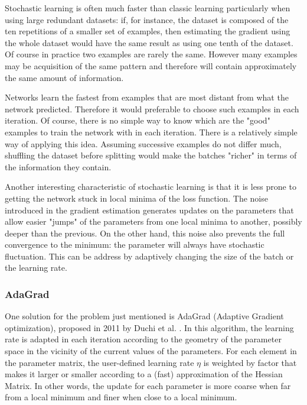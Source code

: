 Stochastic learning is often much faster than classic learning particularly when using large redundant datasets: if, for instance, the dataset is composed of the ten repetitions of a smaller set of examples, then estimating the gradient using the whole dataset would have the same result as using one tenth of the dataset. Of course in practice two examples are rarely the same. However many examples may be acquisition of the same pattern and therefore will contain approximately the same amount of information.

Networks learn the fastest from examples that are most distant from what the network predicted. Therefore it would preferable to choose such examples in each iteration. Of course, there is no simple way to know which are the "good" examples to train the network with in each iteration. There is a relatively simple way of applying this idea. Assuming successive examples do not differ much, shuffling the dataset before splitting would make the batches "richer" in terms of the information they contain.

Another interesting characteristic of stochastic learning is that it is less prone to getting the network stuck in local minima of the loss function. The noise introduced in the gradient estimation generates updates on the parameters that allow easier "jumps" of the parameters from one local minima to another, possibly deeper than the previous. On the other hand, this noise also prevents the full convergence to the minimum: the parameter will always have stochastic fluctuation. This can be address by  adaptively changing the size of the batch or the learning rate. \cite{lecun2012efficient}

\subsubsection{AdaGrad}
\label{subsubsec:Adagrad}
One solution for the problem just mentioned is AdaGrad (Adaptive Gradient optimization), proposed in 2011 by Duchi et al. \cite{duchi2011adaptive}. In this algorithm, the learning rate is adapted in each iteration according to the geometry of the parameter space in the vicinity of the current values of the parameters. For each element in the parameter matrix, the user-defined learning rate $\eta$ is weighted by factor that makes it larger or smaller according to a (fast) approximation of the Hessian Matrix. In other words, the update for each parameter is more coarse when far from a local minimum and finer when close to a local minimum.

